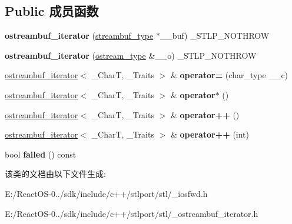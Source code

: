 \subsection*{Public 成员函数}
\begin{DoxyCompactItemize}
\item 
\mbox{\label{classostreambuf__iterator_afdf7be5c9a56856033af722dcce394ba}} 
{\bfseries ostreambuf\+\_\+iterator} (\hyperlink{classbasic__streambuf}{streambuf\+\_\+type} $\ast$\+\_\+\+\_\+buf) \+\_\+\+S\+T\+L\+P\+\_\+\+N\+O\+T\+H\+R\+OW
\item 
\mbox{\label{classostreambuf__iterator_ac4be25848e46972208dfabf59e53c16a}} 
{\bfseries ostreambuf\+\_\+iterator} (\hyperlink{classbasic__ostream}{ostream\+\_\+type} \&\+\_\+\+\_\+o) \+\_\+\+S\+T\+L\+P\+\_\+\+N\+O\+T\+H\+R\+OW
\item 
\mbox{\label{classostreambuf__iterator_a2487ad405238c9ba29fadb9ce8eb4d64}} 
\hyperlink{classostreambuf__iterator}{ostreambuf\+\_\+iterator}$<$ \+\_\+\+CharT, \+\_\+\+Traits $>$ \& {\bfseries operator=} (char\+\_\+type \+\_\+\+\_\+c)
\item 
\mbox{\label{classostreambuf__iterator_a0f0336593299fcc30f576b7d39dc6594}} 
\hyperlink{classostreambuf__iterator}{ostreambuf\+\_\+iterator}$<$ \+\_\+\+CharT, \+\_\+\+Traits $>$ \& {\bfseries operator$\ast$} ()
\item 
\mbox{\label{classostreambuf__iterator_a4329920a7ed9fd3578e9b7b92587de66}} 
\hyperlink{classostreambuf__iterator}{ostreambuf\+\_\+iterator}$<$ \+\_\+\+CharT, \+\_\+\+Traits $>$ \& {\bfseries operator++} ()
\item 
\mbox{\label{classostreambuf__iterator_a2c8e04bf300305e6cf58edb2f1d54f88}} 
\hyperlink{classostreambuf__iterator}{ostreambuf\+\_\+iterator}$<$ \+\_\+\+CharT, \+\_\+\+Traits $>$ \& {\bfseries operator++} (int)
\item 
\mbox{\label{classostreambuf__iterator_a61635fffa281dfd8e1a8a7bc08019bf7}} 
bool {\bfseries failed} () const
\end{DoxyCompactItemize}


该类的文档由以下文件生成\+:\begin{DoxyCompactItemize}
\item 
E\+:/\+React\+O\+S-\/0../sdk/include/c++/stlport/stl/\+\_\+iosfwd.\+h\item 
E\+:/\+React\+O\+S-\/0../sdk/include/c++/stlport/stl/\+\_\+ostreambuf\+\_\+iterator.\+h\end{DoxyCompactItemize}
